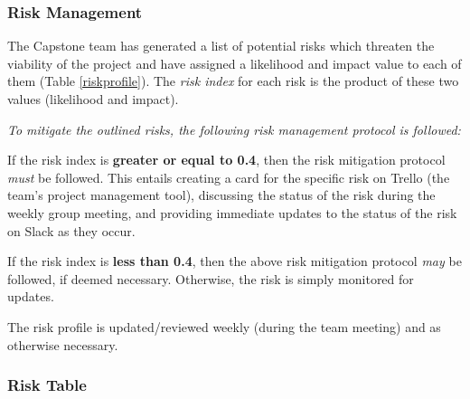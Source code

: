 \subsubsection{Risk Management}
The Capstone team has generated a list of potential risks which threaten the viability of the project and have assigned a likelihood and impact value to each of them (Table \ref{riskprofile}). The \textit{risk index} for each risk is the product of these two values (likelihood and impact). 

\textit{To mitigate the outlined risks, the following risk management protocol is followed:}


If the risk index is \textbf{greater or equal to 0.4}, then the risk mitigation protocol \textit{must} be followed. This entails creating a card for the specific risk on Trello (the team's project management tool), discussing the status of the risk during the weekly group meeting, and providing immediate updates to the status of the risk on Slack as they occur.

If the risk index is \textbf{less than 0.4}, then the above risk mitigation protocol \textit{may} be followed, if deemed necessary. Otherwise, the risk is simply monitored for updates.

The risk profile is updated/reviewed weekly (during the team meeting) and as otherwise necessary. 


\subsubsection{Risk Table}

